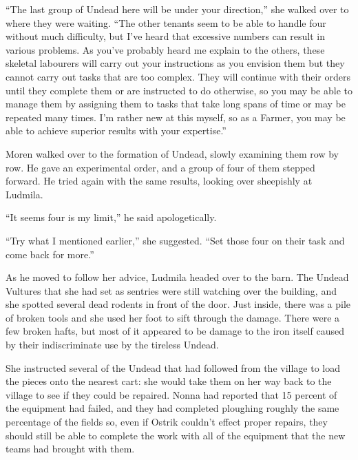  

“The last group of Undead here will be under your direction,” she walked over to where they were waiting. “The other tenants seem to be able to handle four without much difficulty, but I’ve heard that excessive numbers can result in various problems. As you’ve probably heard me explain to the others, these skeletal labourers will carry out your instructions as you envision them but they cannot carry out tasks that are too complex. They will continue with their orders until they complete them or are instructed to do otherwise, so you may be able to manage them by assigning them to tasks that take long spans of time or may be repeated many times. I’m rather new at this myself, so as a Farmer, you may be able to achieve superior results with your expertise.”

 

Moren walked over to the formation of Undead, slowly examining them row by row. He gave an experimental order, and a group of four of them stepped forward. He tried again with the same results, looking over sheepishly at Ludmila.

 

“It seems four is my limit,” he said apologetically.

 

“Try what I mentioned earlier,” she suggested. “Set those four on their task and come back for more.”

 

As he moved to follow her advice, Ludmila headed over to the barn. The Undead Vultures that she had set as sentries were still watching over the building, and she spotted several dead rodents in front of the door. Just inside, there was a pile of broken tools and she used her foot to sift through the damage. There were a few broken hafts, but most of it appeared to be damage to the iron itself caused by their indiscriminate use by the tireless Undead.

 

She instructed several of the Undead that had followed from the village to load the pieces onto the nearest cart: she would take them on her way back to the village to see if they could be repaired. Nonna had reported that 15 percent of the equipment had failed, and they had completed ploughing roughly the same percentage of the fields so, even if Ostrik couldn’t effect proper repairs, they should still be able to complete the work with all of the equipment that the new teams had brought with them.

